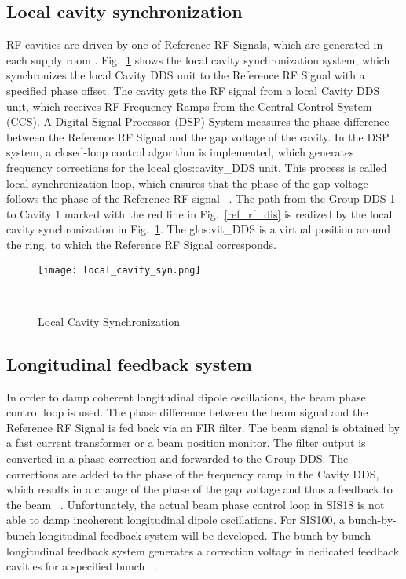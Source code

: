 \subsection{Local cavity synchronization}
RF cavities are driven by one of Reference RF Signals, which are generated in each supply room . Fig.~\ref{local_cavity_syn} shows the local cavity synchronization system, which synchronizes the local Cavity DDS unit to the Reference RF Signal with a specified phase offset. The cavity gets the RF signal from a local Cavity \gls{DDS} unit, which receives RF Frequency Ramps from the Central Control System (\gls{CCS}). A Digital Signal Processor (\gls{DSP})-System measures the phase difference between the Reference RF Signal and the gap voltage of the cavity. In the DSP system, a closed-loop control algorithm is implemented, which generates frequency corrections for the local \gls{glos:cavity_DDS} unit. This process is called local synchronization loop, which ensures that the phase of the gap voltage follows the phase of the Reference RF signal ~\cite{klingbeil_new_2011}. The path from the Group DDS 1 to Cavity 1 marked with the red line in Fig.~\ref{ref_rf_dis} is realized by the local cavity synchronization in Fig.~\ref{local_cavity_syn}. The \gls{glos:vit_DDS} is a virtual position around the ring, to which the Reference RF Signal corresponds.
\begin{figure}[H]
   \centering   
   \texttt{[image: local\_cavity\_syn.png]}
   \caption{Local Cavity Synchronization}{~\cite{klingbeil_new_2011}}
   \label{local_cavity_syn}
\end{figure}
\subsection{Longitudinal feedback system}
In order to damp coherent longitudinal dipole oscillations, the beam phase control loop is used. The phase difference between the beam signal and the Reference RF Signal is fed back via an FIR filter. The beam signal is obtained by a fast current transformer or a beam position monitor. The filter output is converted in a phase-correction and forwarded to the Group DDS. The corrections are added to the phase of the  frequency ramp in the Cavity DDS, which results in a change of the phase of the gap voltage and thus a feedback to the beam ~\cite{baudrenghien_low-level_2010}. Unfortunately, the actual beam phase control loop in SIS18 is not able to damp incoherent longitudinal dipole oscillations. For SIS100, a bunch-by-bunch longitudinal feedback system will be developed. The bunch-by-bunch longitudinal feedback system generates a correction voltage in dedicated feedback cavities for a specified bunch ~\cite{gross_bunch-by-bunch_2015}. 


